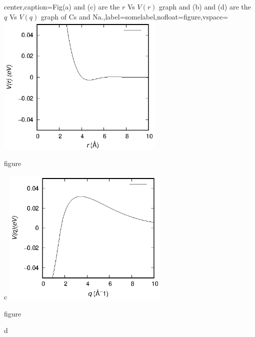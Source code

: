 \documentclass[final,12pt]{elsarticle}
\begin{document}
{\begin{adjustbox}{center,caption={Fig(a) and (c) are the $r$ Vs $V(r)$ graph and (b) and (d) are the $q$ Vs $V(q)$ graph  of Cs and Na.},label={somelabel},nofloat=figure,vspace=\bigskipamount}
	\includegraphics[width=0.6\textwidth]{vNaBRET.eps}
	\caption{figure}{c}
	\includegraphics[width=0.6\textwidth]{vNaFFACT.eps}
	\caption{figure}{d}
\end{adjustbox}

}
\end{document}
